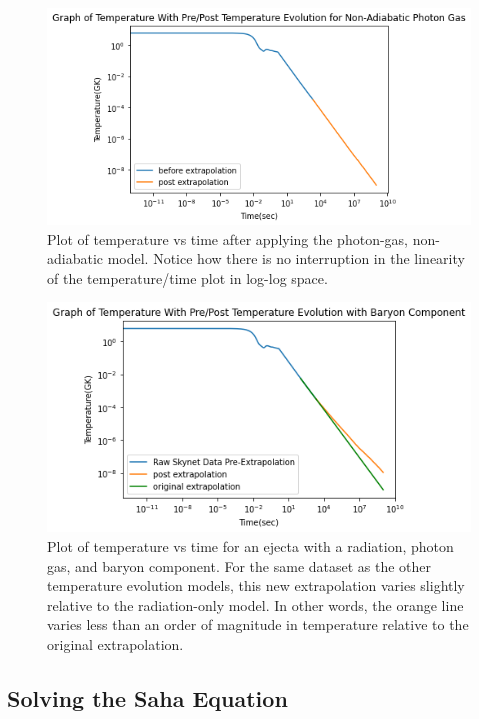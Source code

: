 \documentclass[11pt,a4paper]{article}
\begin{document}
\begin{figure}[h!]
  \includegraphics[scale = .7]{photon_only.png}
  \centering
  \caption{Plot of temperature vs time after applying the photon-gas, non-adiabatic model. Notice how there is no interruption in the linearity of the temperature/time plot in log-log space.}
\end{figure} 

\begin{figure}[H]
  \includegraphics[scale = .7]{photon_baryon.png}
  \centering
  \caption{Plot of temperature vs time for an ejecta with a radiation, photon gas, and baryon component. For the same dataset as the other temperature evolution models, this new extrapolation varies slightly relative to the radiation-only model. In other words, the orange line varies less than an order of magnitude in temperature relative to the original extrapolation. }
\end{figure} 

\pagebreak

\subsection{Solving the Saha Equation}
\end{document}
